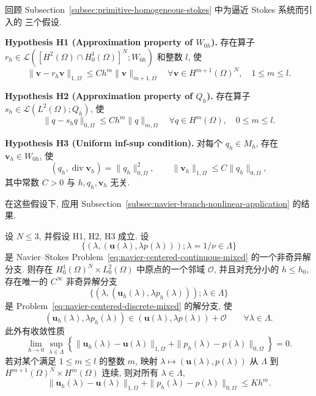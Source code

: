 回顾 Subsection~\ref{subsec:primitive-homogeneous-stokes} 中为逼近 Stokes 系统而引入的
三个假设.

\textbf{Hypothesis H1 (Approximation property of $W_{0h}$).}
存在算子
$r_h\in\mathcal L([H^2(\Omega)\cap H_0^1(\Omega)]^N;W_{0h})$ 和整数 $l$, 使
\begin{equation}\label{eq:navier-centered-h1-approximation}
\|\boldsymbol v-r_h\boldsymbol v\|_{1,\Omega}
\leq Ch^m\|\boldsymbol v\|_{m+1,\Omega}
\quad\forall\boldsymbol v\in H^{m+1}(\Omega)^N,
\quad1\leq m\leq l.
\end{equation}

\textbf{Hypothesis H2 (Approximation property of $Q_h$).}
存在算子 $s_h\in\mathcal L(L^2(\Omega);Q_h)$, 使
\begin{equation}\label{eq:navier-centered-h2-approximation}
\|q-s_hq\|_{0,\Omega}
\leq Ch^m\|q\|_{m,\Omega}
\quad\forall q\in H^m(\Omega),
\quad0\leq m\leq l.
\end{equation}

\textbf{Hypothesis H3 (Uniform inf-sup condition).}
对每个 $q_h\in M_h$, 存在 $\boldsymbol v_h\in W_{0h}$, 使
\begin{equation}\label{eq:navier-centered-h3-infsup}
(q_h,\operatorname{div}\boldsymbol v_h)=\|q_h\|_{0,\Omega}^2,
\qquad
\|\boldsymbol v_h\|_{1,\Omega}\leq C\|q_h\|_{0,\Omega},
\end{equation}
其中常数 $C>0$ 与 $h,q_h,\boldsymbol v_h$ 无关.

在这些假设下, 应用 Subsection~\ref{subsec:navier-branch-nonlinear-application}
的结果.

\setcounter{statement}{0}
\begin{Theorem}\label{thm:navier-centered-discontinuous-branch}
设 $N\leq3$, 并假设 H1, H2, H3 成立. 设
\[
\{(\lambda,(\boldsymbol u(\lambda),\lambda p(\lambda)));
\lambda=1/\nu\in\Lambda\}
\]
是 Navier--Stokes Problem~\eqref{eq:navier-centered-continuous-mixed}
的一个非奇异解分支. 则存在
$H_0^1(\Omega)^N\times L_0^2(\Omega)$ 中原点的一个邻域 $\mathcal O$,
并且对充分小的 $h\leq h_0$, 存在唯一的 $C^\infty$ 非奇异解分支
\[
\{(\lambda,(\boldsymbol u_h(\lambda),\lambda p_h(\lambda)));
\lambda\in\Lambda\}
\]
是 Problem~\eqref{eq:navier-centered-discrete-mixed} 的解分支, 使
\[
(\boldsymbol u_h(\lambda),\lambda p_h(\lambda))
\in(\boldsymbol u(\lambda),\lambda p(\lambda))+\mathcal O
\qquad\forall\lambda\in\Lambda.
\]
此外有收敛性质
\begin{equation}\label{eq:navier-centered-discontinuous-convergence}
\lim_{h\to0}\sup_{\lambda\in\Lambda}
\left\{
\|\boldsymbol u_h(\lambda)-\boldsymbol u(\lambda)\|_{1,\Omega}
+\|p_h(\lambda)-p(\lambda)\|_{0,\Omega}
\right\}=0.
\end{equation}
若对某个满足 $1\leq m\leq l$ 的整数 $m$, 映射
$\lambda\mapsto(\boldsymbol u(\lambda),p(\lambda))$ 从 $\Lambda$ 到
$H^{m+1}(\Omega)^N\times H^m(\Omega)$ 连续, 则对所有
$\lambda\in\Lambda$,
\begin{equation}\label{eq:navier-centered-discontinuous-hm-error}
\|\boldsymbol u_h(\lambda)-\boldsymbol u(\lambda)\|_{1,\Omega}
+\|p_h(\lambda)-p(\lambda)\|_{0,\Omega}
\leq Kh^m.
\end{equation}
\end{Theorem}

